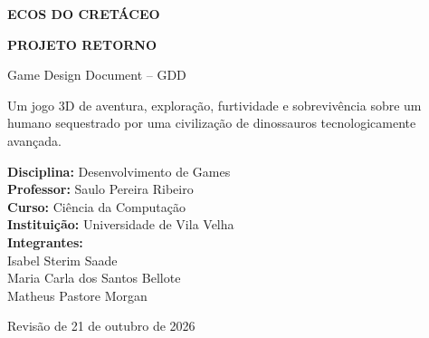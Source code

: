 \documentclass[12pt,a4paper]{article}
\begin{document}

\begin{titlepage}
    \centering

    \vspace*{2cm}

    {\Huge\bfseries ECOS DO CRETÁCEO\par}
    \vspace{0.3cm}
    {\LARGE\bfseries PROJETO RETORNO\par}

    \vspace{0.8cm}

    {\Large Game Design Document -- GDD\par}

    \vspace{1.5cm}

    {\large
    Um jogo 3D de aventura, exploração, furtividade e sobrevivência
    sobre um humano sequestrado por uma civilização de dinossauros
    tecnologicamente avançada.
    \par}

    \vfill

    \begin{flushleft}
        \textbf{Disciplina:} Desenvolvimento de Games\\
        \textbf{Professor:} Saulo Pereira Ribeiro\\
        \textbf{Curso:} Ciência da Computação\\
        \textbf{Instituição:} Universidade de Vila Velha\\[0.5cm]

        \textbf{Integrantes:}\\
        Isabel Sterim Saade\\
        Maria Carla dos Santos Bellote\\
        Matheus Pastore Morgan\\
       
    \end{flushleft}

    \vfill

    {\large Revisão de 21 de outubro de 2026\par}

    \thispagestyle{empty}
\end{titlepage}

\end{document}
